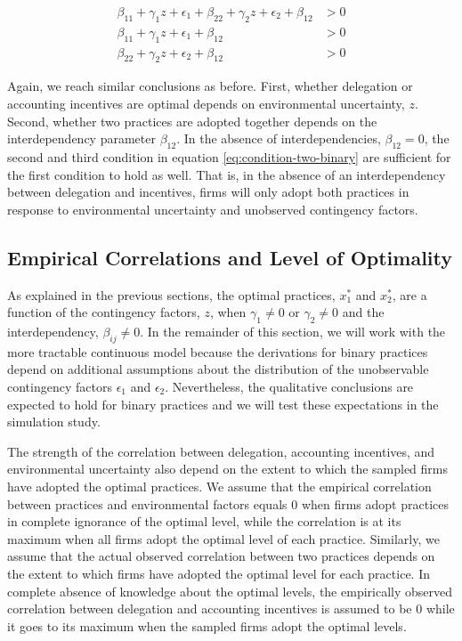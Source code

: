 \documentclass[12pt]{article}
\begin{document}
\begin{equation} \label{eq:condition-two-binary}
    \begin{aligned}
        \beta_{11} +  \gamma_1 z  + \epsilon_1
        + \beta_{22} + \gamma_2 z + \epsilon_2
        + \beta_{12}  &> 0 \\
        \beta_{11} + \gamma_1 z  + \epsilon_1 + \beta_{12}  &> 0 \\
        \beta_{22} + \gamma_2 z + \epsilon_2  + \beta_{12} &> 0 
    \end{aligned} 
\end{equation}

Again, we reach similar conclusions as before. First, whether delegation or accounting incentives are optimal depends on environmental uncertainty, $z$. Second, whether two practices are adopted together depends on the interdependency parameter $\beta_{12}$. In the absence of interdependencies, $\beta_{12} = 0$, the second and third condition in equation \eqref{eq:condition-two-binary} are sufficient for the first condition to hold as well. That is, in the absence of an interdependency between delegation and incentives, firms will only adopt both practices in response to environmental uncertainty and unobserved contingency factors.

\subsection{Empirical Correlations and Level of Optimality}

As explained in the previous sections, the optimal practices, $x^*_1$ and $x_2^*$, are a function of the contingency factors, $z$, when $\gamma_1 \neq 0$ or $\gamma_2 \neq 0$ and the interdependency, $\beta_{ij} \neq 0$. In the remainder of this section, we will work with the more tractable continuous model because the derivations for binary practices depend on additional assumptions about the distribution of the unobservable contingency factors $\epsilon_1$ and $\epsilon_2$. Nevertheless, the qualitative conclusions are expected to hold for binary practices and we will test these expectations in the simulation study.

The strength of the correlation between delegation, accounting incentives, and environmental uncertainty also depend on the extent to which the sampled firms have adopted the optimal practices. We assume that the empirical correlation between practices and environmental factors equals $0$ when firms adopt practices in complete ignorance of the optimal level, while the correlation is at its maximum when all firms adopt the optimal level of each practice. Similarly, we assume that the actual observed correlation between two practices depends on the extent to which firms have adopted the optimal level for each practice. In complete absence of knowledge about the optimal levels, the empirically observed correlation between delegation and accounting incentives is assumed to be $0$ while it goes to its maximum when the sampled firms adopt the optimal levels. 
\end{document}
